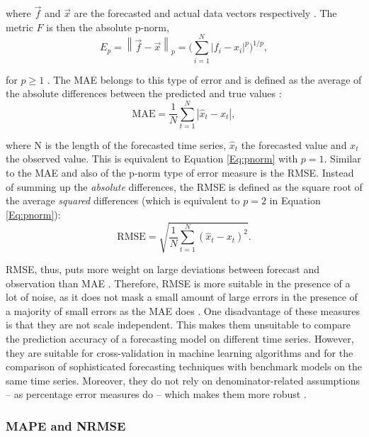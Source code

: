 \noindent where $\vec{f}$ and $\vec{x}$ are the forecasted and actual data vectors respectively \citep{Haben:2014}. The metric $F$ is then the absolute p-norm,
%
\begin{equation} \label{Eq:pnorm}
    E_p=\left\lVert\vec{f}-\vec{x}\right\rVert_p=\biggl(\sum_{i=1}^N \left|f_i-x_i\right|^p\biggr)^{1/p},
\end{equation}

\noindent for $p\geq1$ \citep[][p. 52]{golub:2012}. The MAE belongs to this type of error and is defined as the average of the absolute differences between the predicted and true values \citep{Hoff:2013}:
%
\begin{equation} \label{Eq:MAE}
\text{MAE}=\frac{1}{N}\sum_{t=1}^N\left|\widehat{x}_t-x_t\right|,    
\end{equation}

\noindent where N is the length of the forecasted time series, $\widehat{x}_t$ the forecasted value and $x_t$ the observed value. This is equivalent to Equation \ref{Eq:pnorm} with $p=1$. Similar to the MAE and also of the p-norm type of error measure is the RMSE. Instead of summing up the \textit{absolute} differences, the RMSE is defined as the square root of the average \textit{squared} differences (which is equivalent to $p=2$ in Equation \ref{Eq:pnorm}):
%
\begin{equation} \label{Eq:RMSE}
\text{RMSE}=\sqrt{\frac{1}{N}\sum_{t=1}^N\left(\widehat{x}_t-x_t\right)^2}.
\end{equation}

\noindent RMSE, thus, puts more weight on large deviations between forecast and observation than MAE \citep{Meer:2018}. Therefore, RMSE is more suitable in the presence of a lot of noise, as it does not mask a small amount of large errors in the presence of a majority of small errors as the MAE does \citep{Zhang:2015}. One disadvantage of these measures is that they are not scale independent. This makes them unsuitable to compare the prediction accuracy of a forecasting model on different time series. However, they are suitable for cross-validation in machine learning algorithms and for the comparison of sophisticated forecasting techniques with benchmark models on the same time series. Moreover, they do not rely on denominator-related assumptions -- as percentage error measures do -- which makes them more robust \citep{Hoff:2013}.


\subsubsection{MAPE and NRMSE}

